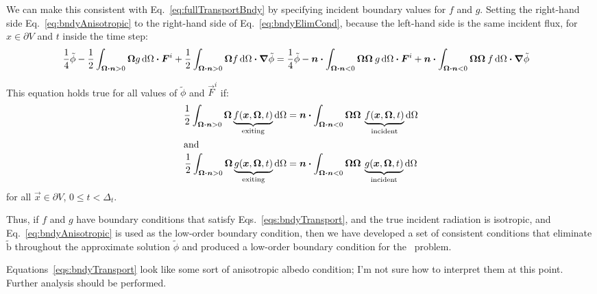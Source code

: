 We can make this consistent with Eq.~\eqref{eq:fullTransportBndy} by specifying
incident boundary values for $f$ and $g$. Setting the right-hand side
Eq.~\eqref{eq:bndyAnisotropic} to the right-hand side of
Eq.~\eqref{eq:bndyElimCond}, because the left-hand side is the same incident
flux, for $x \in \partial V$ and $t$ inside the time step:
\begin{align*}
 \frac{1}{4} \tilde\phi
 - \frac{1}{2} \int_{\bm{\Omega} \bm{\cdot} \bm{n} > 0} \bm{\Omega}
 g \mathop{}\!\mathrm{d}\Omega 
 \bm{\cdot} \bm{F}^i
 + \frac{1}{2} \int_{\bm{\Omega} \bm{\cdot} \bm{n} > 0} \bm{\Omega}
 f \mathop{}\!\mathrm{d}\Omega
  \bm{\cdot} \bm{\nabla}\tilde\phi
&=
 \frac1{4} \tilde \phi
 - \bm{n} \bm{\cdot} \int_{\bm{\Omega} \bm{\cdot} \bm{n} < 0} \bm{\Omega} \bm{\Omega}\:
 g \mathop{}\!\mathrm{d}\Omega \bm{\cdot} \bm{F}^i
 + \bm{n} \bm{\cdot} \int_{\bm{\Omega} \bm{\cdot} \bm{n} < 0} \bm{\Omega} \bm{\Omega}\:
 f \mathop{}\!\mathrm{d}\Omega \bm{\cdot} \bm{\nabla} \tilde\phi
\end{align*}

This equation holds true for all values of $\tilde\phi$ and $\vec{F}^i$ if:
\begin{subequations} \label{eqs:bndyTransport}
\begin{align} \label{eq:bndyF}
  \frac{1}{2} \int_{\bm{\Omega} \bm{\cdot} \bm{n} > 0} \bm{\Omega}
 \underbrace{f(\bm{x}, \bm{\Omega}, t)}_{\text{exiting}} \mathop{}\!\mathrm{d}\Omega
 &= \bm{n} \bm{\cdot} \int_{\bm{\Omega} \bm{\cdot} \bm{n} < 0} \bm{\Omega} \bm{\Omega}\:
 \underbrace{f(\bm{x}, \bm{\Omega}, t)}_{\text{incident}} \mathop{}\!\mathrm{d}\Omega
 \\ \intertext{and} \label{eq:bndyG}
  \frac{1}{2} \int_{\bm{\Omega} \bm{\cdot} \bm{n} > 0} \bm{\Omega}
 \underbrace{g(\bm{x}, \bm{\Omega}, t)}_{\text{exiting}} \mathop{}\!\mathrm{d}\Omega
 &= \bm{n} \bm{\cdot} \int_{\bm{\Omega} \bm{\cdot} \bm{n} < 0} \bm{\Omega} \bm{\Omega}\:
 \underbrace{g(\bm{x}, \bm{\Omega}, t)}_{\text{incident}} \mathop{}\!\mathrm{d}\Omega
\end{align}
\end{subequations}
for all $\vec{x} \in \partial V$, $0\le t < \Delta_t$.

Thus, if $f$ and $g$ have boundary conditions that satisfy
Eqs.~\eqref{eqs:bndyTransport}, and the true incident radiation is isotropic,
and Eq.~\eqref{eq:bndyAnisotropic} is used as the low-order boundary condition,
then we have developed a set of consistent conditions that eliminate
$\mathrm{\tilde b}$ throughout the approximate solution $\tilde\phi$ and
produced a low-order boundary condition for the \APone\ problem.

Equations~\eqref{eqs:bndyTransport} look like some sort of anisotropic albedo
condition; I'm not sure how to interpret them at this point. Further analysis
should be performed.

